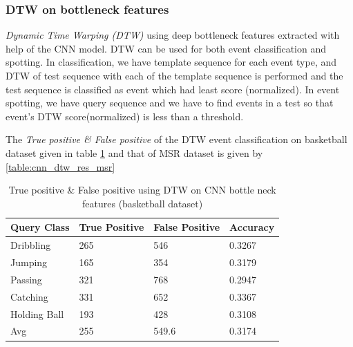 \subsubsection{DTW on bottleneck features}
\textit{Dynamic Time Warping (DTW)} using deep bottleneck features extracted with help of the CNN model. DTW can be used for both event classification and spotting. In classification, we have template sequence for each event type, and DTW of test sequence with each of the template sequence is performed and the test sequence is classified as event which had least score (normalized). In event spotting, we have query sequence and we have to find events in a test so that event's DTW score(normalized) is less than a threshold.


The \textit{True positive \& False positive} of the DTW event classification on basketball dataset given in table \ref{table:cnn_dtw_res_basket} and that of MSR dataset is given by \ref{table:cnn_dtw_res_msr}

\begin{table}[ht]
\caption[Event classification using DTW on CNN bottleneck features (OSUPEL basketball dataset) ]{True positive \& False positive using DTW on CNN bottle neck features (basketball dataset)}
\label{table:cnn_dtw_res_basket}
\centering
\begin{tabular}{|l|l|l|l|}
\hline
Query Class & True Positive & False Positive & Accuracy \\ \hline
Dribbling   &265  &546   &0.3267\\
Jumping     &165  &354   &0.3179\\
Passing     &321  &768   &0.2947\\
Catching    &331  &652   &0.3367\\
Holding Ball &193  &428   &0.3108\\
\hline
Avg         &255  &549.6 &0.3174\\
\hline  
\end{tabular}
\end{table} 

